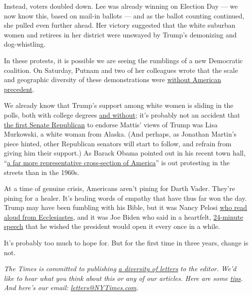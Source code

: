 Instead, voters doubled down. Lee was already winning on Election Day
--- we now know this, based on mail-in ballots --- and as the ballot
counting continued, she pulled even further ahead. Her victory suggested
that the white suburban women and retirees in her district were unswayed
by Trump's demonizing and dog-whistling.

In these protests, it is possible we are seeing the rumblings of a new
Democratic coalition. On Saturday, Putnam and two of her colleagues
wrote that the scale and geographic diversity of these demonstrations
were
\href{https://www.washingtonpost.com/politics/2020/06/06/floyd-protests-are-broadest-us-history-are-spreading-white-small-town-america/}{without
American precedent}.

We already know that Trump's support among white women is sliding in the
polls, both with college degrees
\href{http://rookings.edu/blog/fixgov/2020/06/03/new-polling-eroding-support-from-white-working-class-women-threatens-trumps-reelection}{and
without}; it's probably not an accident that
\href{https://www.nytimes3xbfgragh.onion/2020/06/04/us/politics/murkowski-mattis-trump.html}{the
first Senate Republican} to endorse Mattis' views of Trump was Lisa
Murkowski, a white woman from Alaska. (And perhaps, as Jonathan Martin's
piece hinted, other Republican senators will start to follow, and
refrain from giving him their support.) As Barack Obama pointed out in
his recent town hall,
``\href{https://www.rev.com/blog/transcripts/barack-obama-speech-transcript-on-george-floyd-death-protests}{a
far more representative cross-section of America}'' is out protesting in
the streets than in the 1960s.

At a time of genuine crisis, Americans aren't pining for Darth Vader.
They're pining for a healer. It's healing words of empathy that have
thus far won the day. Trump may have been fumbling with his Bible, but
it was Nancy Pelosi
\href{https://www.cnn.com/2020/06/02/politics/nancy-pelosi-trump-church-response/index.html}{who
read aloud from Ecclesiastes}, and it was Joe Biden who said in a
heartfelt,
\href{https://www.rev.com/blog/transcripts/joe-biden-philadelphia-speech-transcript-on-protests-for-george-floyd}{24-minute
speech} that he wished the president would open it every once in a
while.

It's probably too much to hope for. But for the first time in three
years, change is not.

\emph{The Times is committed to publishing}
\href{https://www.nytimes3xbfgragh.onion/2019/01/31/opinion/letters/letters-to-editor-new-york-times-women.html}{\emph{a
diversity of letters}} \emph{to the editor. We'd like to hear what you
think about this or any of our articles. Here are some}
\href{https://help.nytimes3xbfgragh.onion/hc/en-us/articles/115014925288-How-to-submit-a-letter-to-the-editor}{\emph{tips}}\emph{.
And here's our email:}
\href{mailto:letters@NYTimes.com}{\emph{letters@NYTimes.com}}\emph{.}

